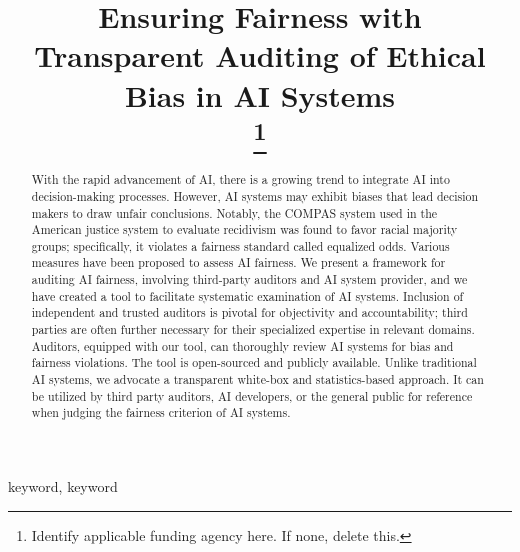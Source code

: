 \documentclass[conference]{IEEEtran}
\begin{document}
\title{Ensuring Fairness with Transparent Auditing of Ethical Bias in AI Systems\\
\thanks{Identify applicable funding agency here. If none, delete this.}
}

\author{
\and
{}
}

\maketitle

\begin{abstract}
With the rapid advancement of AI, there is a growing trend to integrate AI into decision-making processes. However, AI systems may exhibit biases that lead decision makers to draw unfair conclusions. Notably, the COMPAS system used in the American justice system to evaluate recidivism was found to favor racial majority groups; specifically, it violates a fairness standard called equalized odds. Various measures have been proposed to assess AI fairness. We present a framework for auditing AI fairness, involving third-party auditors and AI system provider, and we have created a tool to facilitate systematic examination of AI systems. Inclusion of independent and trusted auditors is pivotal for objectivity and accountability; third parties are often further necessary for their specialized expertise in relevant domains. Auditors, equipped with our tool, can thoroughly review AI systems for bias and fairness violations. The tool is open-sourced and publicly available. Unlike traditional AI systems, we advocate a transparent white-box and statistics-based approach. It can be utilized by third party auditors, AI developers, or the general public for reference when judging the fairness criterion of AI systems.
\end{abstract}

\begin{IEEEkeywords}
keyword, keyword
\end{IEEEkeywords}
\end{document}
